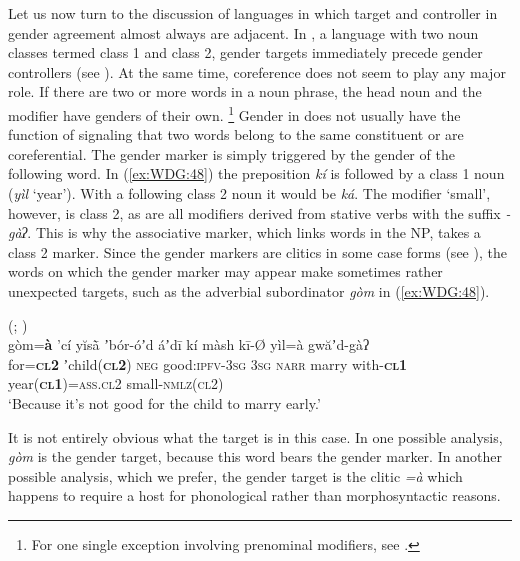 \documentclass[output=collectionpaper]{langsci/langscibook}
\begin{document}
Let us now turn to the discussion of languages in which target and controller in gender agreement almost always are adjacent. In , a language with two noun classes termed class 1 and class 2, gender targets immediately precede gender controllers (see ). At the same time, coreference does not seem to play any major role. If there are two or more words in a noun phrase, the head noun and the modifier have genders of their own.%
\footnote{%
For one single exception involving prenominal modifiers, see \cite[128]{Killian2015}.
} %
Gender in  does not usually have the function of signaling that two words belong to the same constituent or are coreferential. The gender marker is simply triggered by the gender of the following word. In (\ref{ex:WDG:48}) the preposition \textit{kí} is followed by a class 1 noun (\textit{yìl} `year'). With a following class 2 noun it would be \textit{ká}. The modifier `small', however, is class 2, as are all modifiers derived from stative verbs with the suffix \textit{-gàʔ}. This is why the associative marker, which links words in the NP, takes a class 2 marker. Since the gender markers are clitics in some case forms (see ), the words on which the gender marker may appear make sometimes rather unexpected targets, such as the adverbial subordinator \textit{gòm} in (\ref{ex:WDG:48}).

\ea\label{ex:WDG:48}
 (; \citealt[382]{Killian2015})\\
\gll gòm=\textbf{à}	'cí	yĭsā̀	ʼbór-óʼd	áʼdī	kí	màsh	kī-Ø	yìl=à	gwăʼd-gàʔ\\
 for=\textbf{\textsc{cl2}}	ʼchild(\textbf{\textsc{cl2}})	\textsc{neg}	good:\textsc{ipfv-3sg}	\textsc{3sg}	\textsc{narr}	marry	with-\textbf{\textsc{cl1}}	year(\textbf{\textsc{cl1}})=\textsc{ass.cl2}	small-\textsc{nmlz(cl2)}\\
\glt `Because it's not good for the child to marry early.' \\
\z

\noindent It is not entirely obvious what the target is in this case. In one possible analysis, \textit{gòm} is the gender target, because this word bears the gender marker. In another possible analysis, which we prefer, the gender target is the clitic \textit{=à} which happens to require a host for phonological rather than morphosyntactic reasons.
\end{document}
